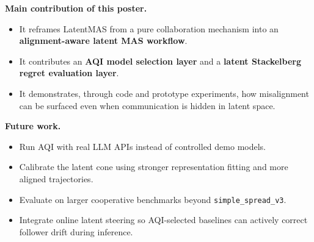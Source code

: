 \documentclass[a0paper,portrait]{baposter}
\newcommand{\compresslist}{%
\setlength{\itemsep}{1pt}%
\setlength{\parskip}{2pt}%
\setlength{\parsep}{0pt}%
}
\begin{document}
\begin{poster}
{\textbf{Main contribution of this poster.}
\begin{itemize}\compresslist
\item It reframes LatentMAS from a pure collaboration mechanism into an \textbf{alignment-aware latent MAS workflow}.
\item It contributes an \textbf{AQI model selection layer} and a \textbf{latent Stackelberg regret evaluation layer}.
\item It demonstrates, through code and prototype experiments, how misalignment can be surfaced even when communication is hidden in latent space.
\end{itemize}

\textbf{Future work.}
\begin{itemize}\compresslist
\item Run AQI with real LLM APIs instead of controlled demo models.
\item Calibrate the latent cone using stronger representation fitting and more aligned trajectories.
\item Evaluate on larger cooperative benchmarks beyond \texttt{simple\_spread\_v3}.
\item Integrate online latent steering so AQI-selected baselines can actively correct follower drift during inference.
\end{itemize}
}
\end{poster}
\end{document}
